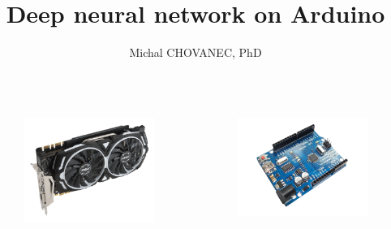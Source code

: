 \documentclass[xcolor=dvipsnames]{beamer}
\title{\bf Deep neural network on Arduino}
\author{Michal CHOVANEC, PhD}
\date[EURP]{}
\begin{document}
\begin{frame}
\titlepage


\begin{columns}
\begin{column}{0.5\textwidth}

  \begin{figure}
    \includegraphics[scale=0.15]{gpu.png}
  \end{figure}

\end{column}
\begin{column}{0.5\textwidth}  %

  \begin{figure}
  \includegraphics[scale=0.1]{arduino.png}
  \end{figure}

\end{column}
\end{columns}

\end{frame}
\end{document}
